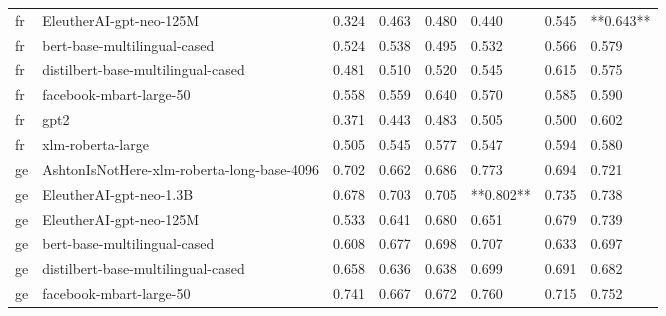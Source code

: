 \begin{tabular}{llllllll}
      fr &                    EleutherAI-gpt-neo-125M & 0.324 &                     0.463 &                 0.480 &                  0.440 &                                   0.545 & **0.643** \\
      fr &               bert-base-multilingual-cased & 0.524 &                     0.538 &                 0.495 &                  0.532 &                                   0.566 &     0.579 \\
      fr &         distilbert-base-multilingual-cased & 0.481 &                     0.510 &                 0.520 &                  0.545 &                                   0.615 &     0.575 \\
      fr &                    facebook-mbart-large-50 & 0.558 &                     0.559 &                 0.640 &                  0.570 &                                   0.585 &     0.590 \\
      fr &                                       gpt2 & 0.371 &                     0.443 &                 0.483 &                  0.505 &                                   0.500 &     0.602 \\
      fr &                          xlm-roberta-large & 0.505 &                     0.545 &                 0.577 &                  0.547 &                                   0.594 &     0.580 \\
      ge & AshtonIsNotHere-xlm-roberta-long-base-4096 & 0.702 &                     0.662 &                 0.686 &                  0.773 &                                   0.694 &     0.721 \\
      ge &                    EleutherAI-gpt-neo-1.3B & 0.678 &                     0.703 &                 0.705 &              **0.802** &                                   0.735 &     0.738 \\
      ge &                    EleutherAI-gpt-neo-125M & 0.533 &                     0.641 &                 0.680 &                  0.651 &                                   0.679 &     0.739 \\
      ge &               bert-base-multilingual-cased & 0.608 &                     0.677 &                 0.698 &                  0.707 &                                   0.633 &     0.697 \\
      ge &         distilbert-base-multilingual-cased & 0.658 &                     0.636 &                 0.638 &                  0.699 &                                   0.691 &     0.682 \\
      ge &                    facebook-mbart-large-50 & 0.741 &                     0.667 &                 0.672 &                  0.760 &                                   0.715 &     0.752 \\

\end{tabular}
